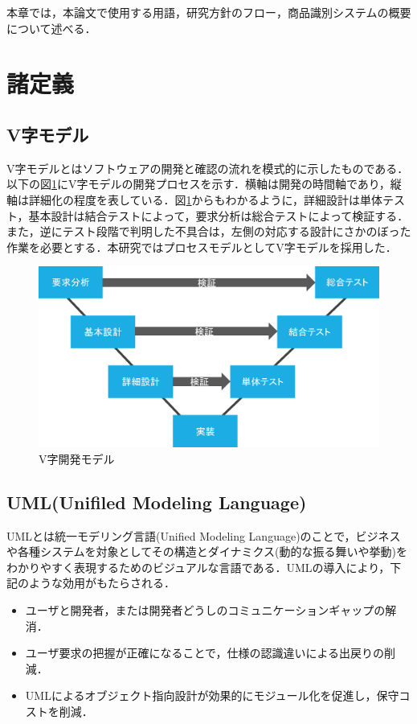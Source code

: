 

本章では，本論文で使用する用語，研究方針のフロー，商品識別システムの概要について述べる．

\section{諸定義}


\subsection*{V字モデル}

V字モデルとはソフトウェアの開発と確認の流れを模式的に示したものである．以下の図\ref{vji}にV字モデルの開発プロセスを示す．横軸は開発の時間軸であり，縦軸は詳細化の程度を表している\cite{kumikomi}．図\ref{vji}からもわかるように，詳細設計は単体テスト，基本設計は結合テストによって，要求分析は総合テストによって検証する．また，逆にテスト段階で判明した不具合は，左側の対応する設計にさかのぼった作業を必要とする\cite{soft}．本研究ではプロセスモデルとしてV字モデルを採用した．

\begin{figure}[htbp]
\centering
\includegraphics[width=12cm]{./picture/vjimodel.eps}
\caption{V字開発モデル}
\label{vji}
\end{figure}


\subsection*{UML(Unifiled Modeling Language)}

UMLとは統一モデリング言語(Unified Modeling Language)のことで，ビジネスや各種システムを対象としてその構造とダイナミクス(動的な振る舞いや挙動)をわかりやすく表現するためのビジュアルな言語\cite{uml}である．UMLの導入により，下記のような効用がもたらされる\cite{uml}．

\begin{itemize}
\item ユーザと開発者，または開発者どうしのコミュニケーションギャップの解消．
\item ユーザ要求の把握が正確になることで，仕様の認識違いによる出戻りの削減．
\item UMLによるオブジェクト指向設計が効果的にモジュール化を促進し，保守コストを削減．
\end{itemize}

